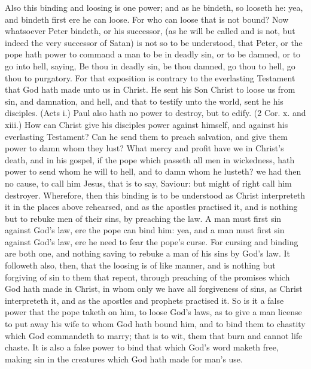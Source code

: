Also this binding and loosing is one power; and as he 
bindeth, so looseth he: yea, and bindeth first ere he can 
loose. For who can loose that is not bound? Now whatsoever
Peter bindeth, or his successor, (as he will be called 
and is not, but indeed the very successor of Satan) is not 
so to be understood, that Peter, or the pope hath power 
to command a man to be in deadly sin, or to be damned, 
or to go into hell, saying, Be thou in deadly sin, be thou 
damned, go thou to hell, go thou to purgatory. For that 
exposition is contrary to the everlasting Testament that 
God hath made unto us in Christ. He sent his Son Christ 
to loose us from sin, and damnation, and hell, and that to 
testify unto the world, sent he his disciples. (Acts i.) Paul 
also hath no power to destroy, but to edify. (2 Cor. x. 
and xiii.) How can Christ give his disciples power against 
himself, and against his everlasting Testament? Can he 
send them to preach salvation, and give them power to 
damn whom they lust? What mercy and profit have we in 
Christ's death, and in his gospel, if the pope which passeth 
all men in wickedness, hath power to send whom he will 
to hell, and to damn whom he lusteth? we had then no 
cause, to call him Jesus, that is to say, Saviour: but 
might of right call him destroyer. Wherefore, then this 
binding is to be understood as Christ interpreteth it in the
places above rehearsed, and as the apostles practised it,
and is nothing but to rebuke men of their sins, by preaching 
the law. A man must first sin against God's law, ere the 
pope can bind him: yea, and a man must first sin against 
God's law, ere he need to fear the pope's curse. For 
cursing and binding are both one, and nothing saving to 
rebuke a man of his sins by God's law. It followeth 
also, then, that the loosing is of like manner, and is nothing 
but forgiving of sin to them that repent, through preaching 
of the promises which God hath made in Christ, in whom 
only we have all forgiveness of sins, as Christ interpreteth 
it, and as the apostles and prophets practised it. So is it 
a false power that the pope taketh on him, to loose God's 
laws, as to give a man license to put away his wife to 
whom God hath bound him, and to bind them to chastity 
which God commandeth to marry; that is to wit, them 
that burn and cannot life chaste. It is also a false power 
to bind that which God's word maketh free, making sin 
in the creatures which God hath made for man's use. 

